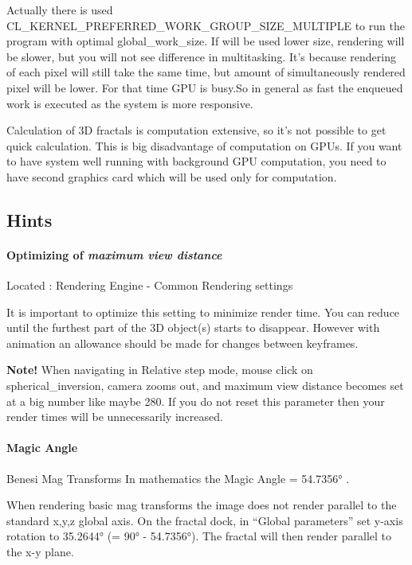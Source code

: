 Actually there is used CL\_KERNEL\_PREFERRED\_WORK\_GROUP\_SIZE\_MULTIPLE to run the program with optimal global\_work\_size. If will be used lower size, rendering will be slower, but you will not see difference in multitasking. It's because rendering of each pixel will still take the same time, but amount of simultaneously rendered pixel will be lower. For that time GPU is busy.So in general as fast the enqueued work is executed as the system is more responsive.

Calculation of 3D fractals is computation extensive, so it's not possible to get quick calculation.
This is big disadvantage of computation on GPUs.
If you want to have system well running with background GPU computation, you need to have second graphics card which will be used only for computation.


\subsection{Hints}\label{Hints}

\paragraph{Optimizing of \emph{maximum view distance}} Located : Rendering
Engine - Common Rendering settings

It is important to optimize this setting to minimize render time. You can reduce
until the furthest part of the 3D object(s) starts to disappear. However with
animation an allowance should be made for changes between keyframes.

\textbf{Note!} When navigating in Relative step mode, mouse click on
spherical\_inversion, camera zooms out, and maximum view distance becomes set at a big number like maybe 280. If you do not reset this parameter then your render times will be unnecessarily increased.


\paragraph{Magic Angle} Benesi Mag Transforms
In mathematics the Magic Angle = 54.7356° .

When rendering basic mag transforms the image does not render parallel to the
standard x,y,z global axis. On the fractal dock, in ``Global parameters'' set
y-axis rotation to 35.2644° (= 90° - 54.7356°). The fractal will then render
parallel to the x-y plane.

